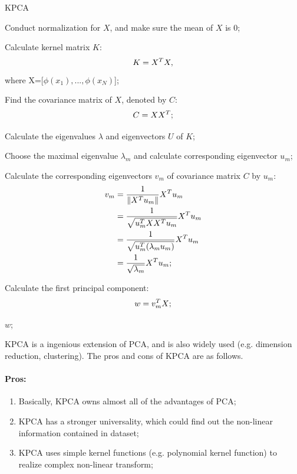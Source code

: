 \documentclass[12pt,a4paper]{article}
\theoremstyle{definition}
\begin{document}
\vspace{0.01\linewidth}
\begin{algorithm}[H]
	\caption{KPCA}
	\label{alg:pca_2}
	\vspace{0.25\baselineskip}
	
	Conduct normalization for $X$, and make sure the mean of $X$ is 0;
	
	Calculate kernel matrix $K$:
	\begin{equation*}
		\centering
		K = X^{T}X,
	\end{equation*}
	where X=[$\phi(x_1),...,\phi(x_N)$];
	
	Find the covariance matrix of $X$, denoted by $C$:
	\begin{equation*}
		\centering
		C = XX^{T};
	\end{equation*}
	
	Calculate the eigenvalues $\lambda$ and eigenvectors $U$ of $K$;
	
	Choose the maximal eigenvalue $\lambda_{m}$ and calculate corresponding eigenvector $u_{m}$;
	
	Calculate the corresponding eigenvectors $v_m$ of covariance matrix $C$ by $u_m$:
	\begin{align*}
		\centering
		v_m &= \dfrac{1}{\|X^Tu_m\|}X^Tu_m \\
		&= \dfrac{1}{\sqrt{u_m^TXX^Tu_m}}X^Tu_m \\
		&= \dfrac{1}{\sqrt{u_m^T(\lambda_m u_m)}}X^Tu_m \\
		&= \dfrac{1}{\sqrt{\lambda_m}}X^Tu_m;
	\end{align*}
		
	Calculate the first principal component:
	\begin{equation*}
		\centering
		w = v_{m}^{T}X;
	\end{equation*}
	
	\Return $w$;
\end{algorithm}
\vspace{0.01\linewidth}

KPCA is a ingenious extension of PCA, and is also widely used (e.g. dimension reduction, clustering). The pros and cons of KPCA are as follows.

\vspace{-0.012\linewidth}
\paragraph{Pros:}
\begin{enumerate}
	\item Basically, KPCA owns almost all of the advantages of PCA;

	\item KPCA has a stronger universality, which could find out the non-linear information contained in dataset;
	
	\item KPCA uses simple kernel functions (e.g. polynomial kernel function) to realize complex non-linear transform;
\end{enumerate}
\end{document}
